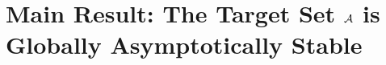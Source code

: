 \documentclass[notheorems, aspectratio=169, presentation]{beamer}
\begin{document}

\section{Main Result: The Target Set ${\mathcal{A}}$ is Globally Asymptotically Stable}
\label{sec:analysis}
\end{document}
